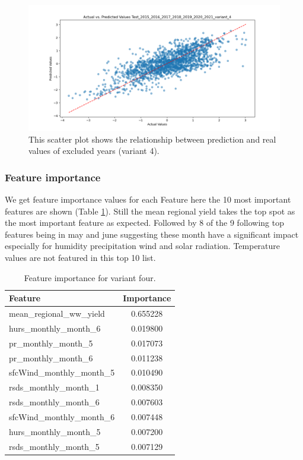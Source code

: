 \documentclass{article}
\begin{document}
\begin{figure}[H]
	\centering
	\includegraphics[width=1.0\textwidth]{./plots/scatter_Test_2015_2016_2017_2018_2019_2020_2021_variant_4.png}
	\caption{\label{fig:scatter_excluded_years_variant_4}This scatter plot shows the relationship between prediction and real values of excluded years (variant 4).}
\end{figure}

\subsubsection{Feature importance}
We get feature importance values for each Feature here the 10 most important features are shown (Table \ref{table:feature_importance_variant_4}).
Still the mean regional yield takes the top spot as the most important feature as expected. Followed by 8 of the 9 following top features being in may and june suggesting these month have a significant impact especially for humidity precipitation wind and solar radiation.
Temperature values are not featured in this top 10 list.
\begin{table}[H]
	\centering
	\begin{tabular}{lc}
		\hline
		Feature                    & Importance \\
		\hline
		mean\_regional\_ww\_yield  & 0.655228   \\
		hurs\_monthly\_month\_6    & 0.019800   \\
		pr\_monthly\_month\_5      & 0.017073   \\
		pr\_monthly\_month\_6      & 0.011238   \\
		sfcWind\_monthly\_month\_5 & 0.010490   \\
		rsds\_monthly\_month\_1    & 0.008350   \\
		rsds\_monthly\_month\_6    & 0.007603   \\
		sfcWind\_monthly\_month\_6 & 0.007448   \\
		hurs\_monthly\_month\_5    & 0.007200   \\
		rsds\_monthly\_month\_5    & 0.007129   \\
		\hline
	\end{tabular}
	\caption{\label{table:feature_importance_variant_4} Feature importance for variant four.}
\end{table}
\end{document}
